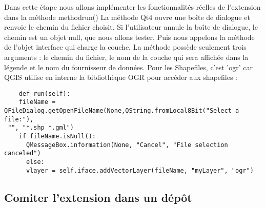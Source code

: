 Dans cette étape nous allons implémenter les fonctionnalités réelles de l'extension
dans la méthode method{run()} La méthode Qt4
 ouvre une boîte de dialogue et renvoie le
chemin du fichier choisit. Si l'utilisateur annule la boîte de dialogue, le
chemin est un objet null, que nous allons tester. Puis nous appelons la méthode
 de l'objet interface qui charge la couche. La méthode
possède seulement trois arguments : le chemin du fichier, le nom de la couche
qui sera affichée dans la légende et le nom du fournisseur de données. Pour les
Shapefiles, c'est 'ogr' car QGIS utilise en interne la bibliothèque OGR pour
accéder aux shapefiles :

\begin{verbatim}
    def run(self):
    fileName = QFileDialog.getOpenFileName(None,QString.fromLocal8Bit("Select a file:"),
 "", "*.shp *.gml")
    if fileName.isNull():
      QMessageBox.information(None, "Cancel", "File selection canceled")
      else:
      vlayer = self.iface.addVectorLayer(fileName, "myLayer", "ogr")
\end{verbatim}


\subsection{Comiter l'extension dans un dépôt}

